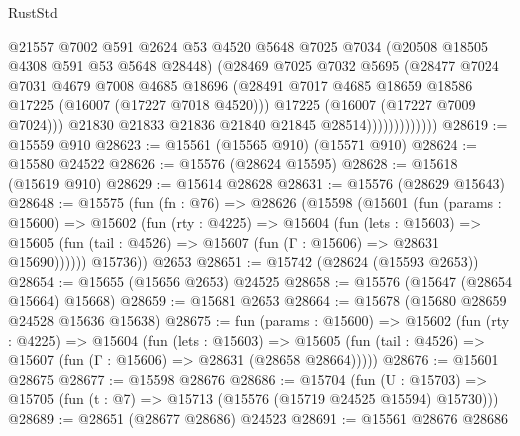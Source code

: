 \begin{lexlean}{RustStd}
\begin{coremodule}
                            @21557
                            @7002
                            @591
                            @2624
                            @53
                            @4520
                            @5648
                            @7025
                            @7034
                            (@20508 @18505 @4308 @591 @53 @5648 @28448)
                            (@28469
                              @7025
                              @7032
                              @5695
                              (@28477
                                @7024
                                @7031
                                @4679
                                @7008
                                @4685
                                @18696
                                (@28491
                                  @7017
                                  @4685
                                  @18659
                                  @18586
                                  @17225
                                  (@16007 (@17227 @7018 @4520)))
                                @17225
                                (@16007 (@17227 @7009 @7024)))
                              @21830
                              @21833
                              @21836
                              @21840
                              @21845
                              @28514)))))))))))))
@28619 := @15559 @910
@28623 := @15561 (@15565 @910) (@15571 @910)
@28624 := @15580 @24522
@28626 := @15576 (@28624 @15595)
@28628 := @15618 (@15619 @910)
@28629 := @15614 @28628
@28631 := @15576 (@28629 @15643)
@28648 := @15575
    (fun (fn : @76) =>
    @28626
      (@15598
        (@15601
          (fun (params : @15600) =>
          @15602
            (fun (rty : @4225) =>
            @15604
              (fun (lets : @15603) =>
              @15605 (fun (tail : @4526) => @15607 (fun (Γ : @15606) => @28631 @15690))))))
        @15736))
    @2653
@28651 := @15742 (@28624 (@15593 @2653))
@28654 := @15655 (@15656 @2653) @24525
@28658 := @15576 (@15647 (@28654 @15664) @15668)
@28659 := @15681 @2653
@28664 := @15678 (@15680 @28659 @24528 @15636 @15638)
@28675 := fun (params : @15600) =>
  @15602
    (fun (rty : @4225) =>
    @15604
      (fun (lets : @15603) =>
      @15605 (fun (tail : @4526) => @15607 (fun (Γ : @15606) => @28631 (@28658 @28664)))))
@28676 := @15601 @28675
@28677 := @15598 @28676
@28686 := @15704
    (fun (U : @15703) => @15705 (fun (t : @7) => @15713 (@15576 (@15719 @24525 @15594) @15730)))
@28689 := @28651 (@28677 @28686) @24523
@28691 := @15561 @28676 @28686

\end{coremodule}
\end{lexlean}
